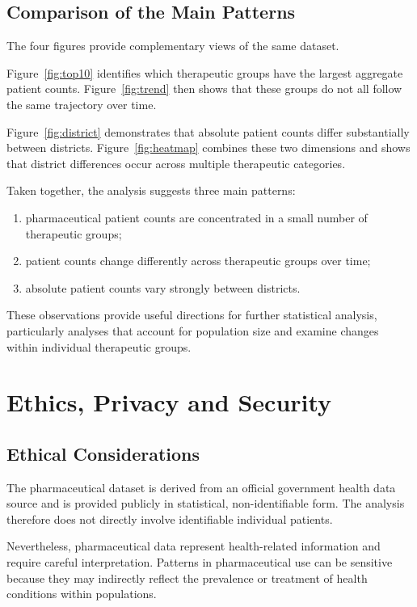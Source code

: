 \documentclass[11pt,a4paper]{report}
\begin{document}
\section{Comparison of the Main Patterns}

The four figures provide complementary views of the same dataset.

Figure~\ref{fig:top10} identifies which therapeutic groups have the largest aggregate patient counts. Figure~\ref{fig:trend} then shows that these groups do not all follow the same trajectory over time.

Figure~\ref{fig:district} demonstrates that absolute patient counts differ substantially between districts. Figure~\ref{fig:heatmap} combines these two dimensions and shows that district differences occur across multiple therapeutic categories.

Taken together, the analysis suggests three main patterns:

\begin{enumerate}
    \item pharmaceutical patient counts are concentrated in a small number of therapeutic groups;
    \item patient counts change differently across therapeutic groups over time;
    \item absolute patient counts vary strongly between districts.
\end{enumerate}

These observations provide useful directions for further statistical analysis, particularly analyses that account for population size and examine changes within individual therapeutic groups.


\chapter{Ethics, Privacy and Security}

\section{Ethical Considerations}

The pharmaceutical dataset is derived from an official government health data source and is provided publicly in statistical, non-identifiable form. The analysis therefore does not directly involve identifiable individual patients.

Nevertheless, pharmaceutical data represent health-related information and require careful interpretation. Patterns in pharmaceutical use can be sensitive because they may indirectly reflect the prevalence or treatment of health conditions within populations.
\end{document}
